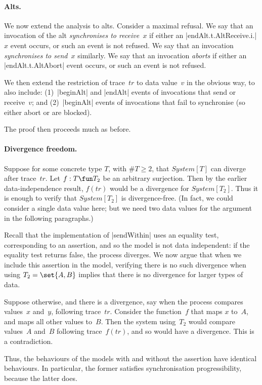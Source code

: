 
\paragraph{Alts.}

We now extend the analysis to alts.  Consider a maximal refusal.  We say that
an invocation of the alt \emph{synchronises to receive~$x$} if either an
|endAlt.t.AltReceive.i.|$x$ event occurs, or such an event is not refused.  We
say that an invocation \emph{synchronises to send~$x$} similarly.  We say that
an invocation \emph{aborts} if either an |endAlt.t.AltAbort| event occurs, or
such an event is not refused.

We then extend the restriction of trace~$tr$ to data value~$v$ in the obvious
way, to also include: (1)~|beginAlt| and |endAlt| events of invocations that
send or receive~$v$; and (2)~|beginAlt| events of invocations that fail to
synchronise (so either abort or are blocked).

The proof then proceeds much as before.


\paragraph{Divergence freedom.}

Suppose  for some concrete type $T$, with $\#T \ge 2$, that $System[T]$
can diverge after trace~$tr$.  Let $f : T \fun T_2$ be an arbitrary
surjection.  Then by the earlier data-independence result, $f(tr)$ would be a
divergence for $System[T_2]$.  Thus it is enough to verify that $System[T_2]$
is divergence-free.  (In fact, we could consider a single data value here; but
we need two data values for the argument in the following paragraphs.)

Recall that the implementation of |sendWithin| uses an equality test,
corresponding to an assertion, and so the model is not data independent: if
the equality test returns false, the process diverges.  We now argue that when
we include this assertion in the model, verifying there is no such divergence
when using $T_2 = \set{A, B}$ implies that there is no divergence for larger
types of data.

Suppose otherwise, and there is a divergence, say when the process compares
values~$x$ and~$y$, following trace~$tr$.  Consider the function~$f$ that maps
$x$ to~$A$, and maps all other values to~$B$.  Then the system using~$T_2$
would compare values~$A$ and~$B$ following trace~$f(tr)$, and so would have a
divergence.  This is a contradiction.

Thus, the behaviours of the models with and without the assertion have
identical behaviours.  In particular, the former satisfies synchronisation
progressibility, because the latter does. 

